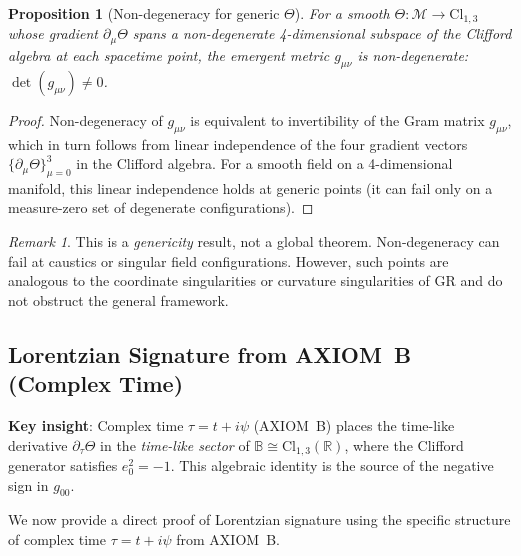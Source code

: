 \documentclass[12pt]{article}
\newtheorem{proposition}[theorem]{Proposition}
\theoremstyle{definition}
\theoremstyle{remark}
\newtheorem{remark}[theorem]{Remark}
\begin{document}
\begin{proposition}[Non-degeneracy for generic $\Theta$]
\label{prop:non_degeneracy}
For a smooth $\Theta:\mathcal{M}\to\mathrm{Cl}_{1,3}$ whose gradient
$\partial_\mu\Theta$ spans a non-degenerate 4-dimensional subspace of the Clifford
algebra at each spacetime point, the emergent metric $g_{\mu\nu}$ is non-degenerate:
$\det(g_{\mu\nu})\neq 0$.
\end{proposition}

\begin{proof}
Non-degeneracy of $g_{\mu\nu}$ is equivalent to invertibility of the Gram matrix
$g_{\mu\nu}$, which in turn follows from linear independence of the four gradient
vectors $\{\partial_\mu\Theta\}_{\mu=0}^3$ in the Clifford algebra.  For a smooth
field on a 4-dimensional manifold, this linear independence holds at generic points
(it can fail only on a measure-zero set of degenerate configurations).
\end{proof}

\begin{remark}
This is a \emph{genericity} result, not a global theorem.  Non-degeneracy can fail at
caustics or singular field configurations.  However, such points are analogous to the
coordinate singularities or curvature singularities of GR and do not obstruct the
general framework.
\end{remark}

\subsection{Lorentzian Signature from AXIOM~B (Complex Time)}
\label{subsec:axiomB_signature}

\begin{tcolorbox}[colback=yellow!5!white,colframe=orange!75!black,title=AXIOM B Proof of Signature]
\textbf{Key insight}: Complex time $\tau = t + i\psi$ (AXIOM~B) places the
time-like derivative $\partial_\tau\Theta$ in the \emph{time-like sector} of
$\mathbb{B}\cong\mathrm{Cl}_{1,3}(\mathbb{R})$, where the Clifford generator
satisfies $e_0^2 = -1$.  This algebraic identity is the source of the negative
sign in $g_{00}$.
\end{tcolorbox}

We now provide a direct proof of Lorentzian signature using the specific structure
of complex time $\tau = t + i\psi$ from AXIOM~B.
\end{document}
